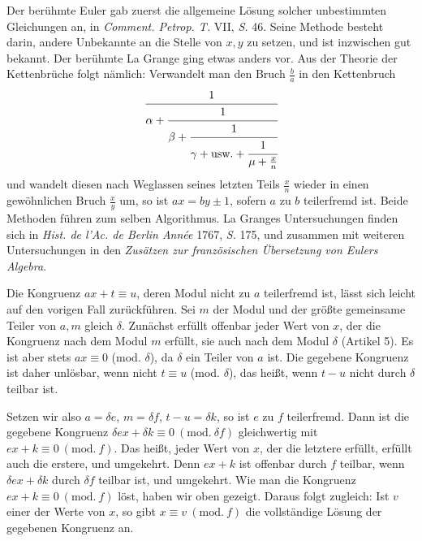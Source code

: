 
Der berühmte Euler gab zuerst die allgemeine Lösung solcher unbestimmten Gleichungen an, in \emph{Comment. Petrop. T.} VII, \emph{S.} 46. Seine Methode besteht darin, andere Unbekannte an die Stelle von $x, y$ zu setzen, und ist inzwischen gut bekannt. Der berühmte La Grange ging etwas anders vor. Aus der Theorie der Kettenbrüche folgt nämlich: Verwandelt man den Bruch $\frac{b}{a}$ in den Kettenbruch
\[
\cfrac{1}{\alpha + \cfrac{1}{\beta + \cfrac{1}{\gamma + \text{usw.} + \cfrac{1}{\mu + \frac{x}{n}}}}}
\]
und wandelt diesen nach Weglassen seines letzten Teils $\frac{x}{n}$ wieder in einen gewöhnlichen Bruch $\frac{x}{y}$ um, so ist $ax=by\pm1$, sofern $a$ zu $b$ teilerfremd ist. Beide Methoden führen zum selben Algorithmus. La Granges Untersuchungen finden sich in \emph{Hist. de l'Ac. de Berlin Année} 1767, \emph{S.} 175, und zusammen mit weiteren Untersuchungen in den \emph{Zusätzen zur französischen Übersetzung von Eulers Algebra}.


Die Kongruenz $ax+t \equiv u$, deren Modul nicht zu $a$ teilerfremd ist, lässt sich leicht auf den vorigen Fall zurückführen. Sei $m$ der Modul und der größte gemeinsame Teiler von $a, m$ gleich $\delta$. Zunächst erfüllt offenbar jeder Wert von $x$, der die Kongruenz nach dem Modul $m$ erfüllt, sie auch nach dem Modul $\delta$ (Artikel 5). Es ist aber stets $ax \equiv 0$ (mod. $\delta$), da $\delta$ ein Teiler von $a$ ist. Die gegebene Kongruenz ist daher unlösbar, wenn nicht $t \equiv u$ (mod. $\delta$), das heißt, wenn $t-u$ nicht durch $\delta$ teilbar ist.

Setzen wir also $a = \delta e$, $m = \delta f$, $t - u = \delta k$, so ist $e$ zu $f$ teilerfremd. Dann ist die gegebene Kongruenz $\delta e x + \delta k \equiv 0 \ (\mathrm{mod.}\ \delta f)$ gleichwertig mit $ex + k \equiv 0 \ (\mathrm{mod.}\ f)$. Das heißt, jeder Wert von $x$, der die letztere erfüllt, erfüllt auch die erstere, und umgekehrt. Denn $ex+k$ ist offenbar durch $f$ teilbar, wenn $\delta e x + \delta k$ durch $\delta f$ teilbar ist, und umgekehrt. Wie man die Kongruenz $ex+k\equiv 0\ (\mathrm{mod.}\ f)$ löst, haben wir oben gezeigt. Daraus folgt zugleich: Ist $v$ einer der Werte von $x$, so gibt $x \equiv v \ (\mathrm{mod.}\ f)$ die vollständige Lösung der gegebenen Kongruenz an.

